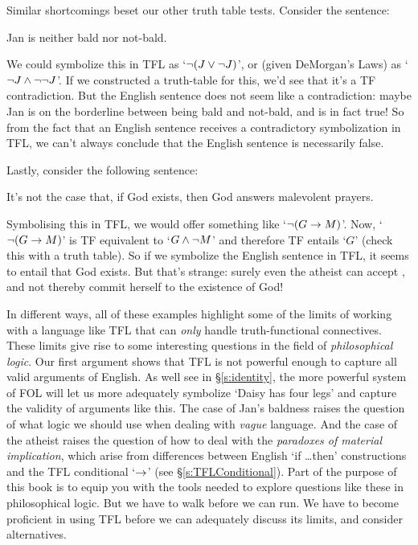 Similar shortcomings beset our other truth table tests. Consider the sentence:
	\begin{earg}
	\setcounter{eargnum}{1}
		\item\label{n:JanBald} Jan is neither bald nor not-bald.
	\end{earg}
We could symbolize this in TFL as `$\neg (J \vee \neg J)$', or (given DeMorgan's Laws) as `$\neg J \wedge \neg \neg J$'. If we constructed a truth-table for this, we'd see that it's a TF contradiction. But the English sentence  does not seem like a contradiction: maybe Jan is on the borderline between being bald and not-bald, and  is in fact true!  So from the fact that an English sentence receives a contradictory symbolization in TFL, we can't always conclude that the English sentence is necessarily false.


Lastly, consider the following sentence:
	\begin{earg}
	\setcounter{eargnum}{2}
		\item\label{n:GodParadox}	It's not the case that, if God exists, then God answers malevolent prayers.
	\end{earg}
Symbolising this in TFL, we would offer something like `$\neg (G \rightarrow M)$'. Now, `$\neg (G \rightarrow M)$' is TF equivalent to `$G \wedge \neg M$' and therefore TF entails `$G$' (check this with a truth table). So if we symbolize the English sentence  in TFL, it seems to entail that God exists. But that's strange: surely even the atheist can accept , and not thereby commit herself to the existence of God!

In different ways, all of these examples highlight some of the limits of working with a language like TFL that can \emph{only} handle truth-functional connectives. These limits give rise to some interesting questions in the field of \emph{philosophical logic}.  Our first argument shows that TFL is not powerful enough to capture all valid arguments of English.  As well see in \S\ref{s:identity}, the more powerful system of FOL will let us more adequately symbolize `Daisy has four legs' and capture the validity of arguments like this.  The case of Jan's baldness raises the question of what logic we should use when dealing with \emph{vague} language. And the case of the atheist raises the question of how to deal with the \emph{paradoxes of material implication}, which arise from differences between English `if \ldots then' constructions and the TFL conditional `$\rightarrow$' (see \S\ref{s:TFLConditional}). Part of the purpose of this book is to equip you with the tools needed to explore questions like these in philosophical logic. But we have to walk before we can run.  We have to become proficient in using TFL before we can adequately discuss its limits, and consider alternatives.



